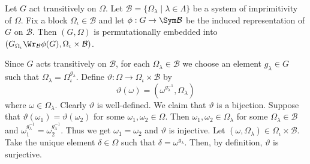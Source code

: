 \begin{theorem} \label{thm-embedding}
	Let $G$ act transitively on $\Omega$. Let $\mathcal{B} = \{\Omega_\lambda\mid \lambda\in\Lambda\}$ be a system of imprimitivity of $\Omega$. Fix a block $\Omega_\iota \in\mathcal{B}$ and let $\phi:G\rightarrow \Sym\mathcal{B}$ be the induced representation of $G$ on $\mathcal{B}$. Then $(G,\Omega)$ is permutationally embedded into $(G_{\Omega_\iota} \Wr_\mathcal{B} \phi(G), \Omega_\iota\times \mathcal{B})$.
\end{theorem}
\begin{sketch}
	Since $G$ acts transitively on $\mathcal{B}$, for each $\Omega_\lambda\in \mathcal{B}$ we choose an element $g_\lambda\in G$ such that $\Omega_\lambda = \Omega_\iota^{g_{\lambda}}$. Define $\vartheta: \Omega \to \Omega_\iota \times \mathcal{B}$ by
	\begin{equation*}
		\vartheta(\omega) = (\omega^{g_{\lambda}^{-1}},\Omega_\lambda) 
	\end{equation*}
	where $\omega \in \Omega_\lambda$. Clearly $\vartheta$ is well-defined. We claim that $\vartheta$ is a bijection. Suppose that $\vartheta(\omega_1) = \vartheta(\omega_2)$ for some $\omega_1,\omega_2\in\Omega$. Then $\omega_1,\omega_2\in \Omega_\lambda$ for some $\Omega_\lambda\in\mathcal{B}$ and $\omega_1^{g_{\lambda}^{-1}}=\omega_2^{g_{\lambda}^{-1}}$. Thus we get $\omega_1 = \omega_2$ and $\vartheta$ is injective. Let $(\omega,\Omega_\lambda)\in \Omega_\iota \times \mathcal{B}$. Take the unique element $\delta\in \Omega$ such that $\delta = \omega^{g_\lambda}$. Then, by definition, $\vartheta$ is surjective.
	

\end{sketch}
